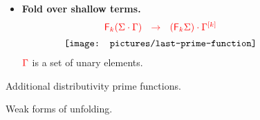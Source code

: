 \begin{figure}
{\begin{minipage}{1\linewidth}
\begin{itemize}
$$\begin{array}{c}
 {\texttt{[image: pictures/shallow-fold-distrib]}} 
\end{array}
$$
\item \textbf{Fold over shallow terms.} 
$$
\begin{array}{c}
 {\color{red}{{\color{red}{\mathsf F_{k}}}(\Sigma\cdot \Gamma)\ \ \to \ \ ({\color{red}{\mathsf F_{k}}}\Sigma) \cdot \Gamma^{{\color{red}{[k]}}}}}\\[5pt]
 {\texttt{[image: pictures/last-prime-function]}} 
\end{array}
$$
${\color{red}{\Gamma}}$ is a set of unary elements.
\end{itemize}
\end{minipage}
}
\caption{Additional distributivity prime functions.} \label{fig:additional-distrib-prime}
\end{figure}

\begin{figure}
\caption{Weak forms of unfolding.}\label{fig:weak-unfolding}
\end{figure}